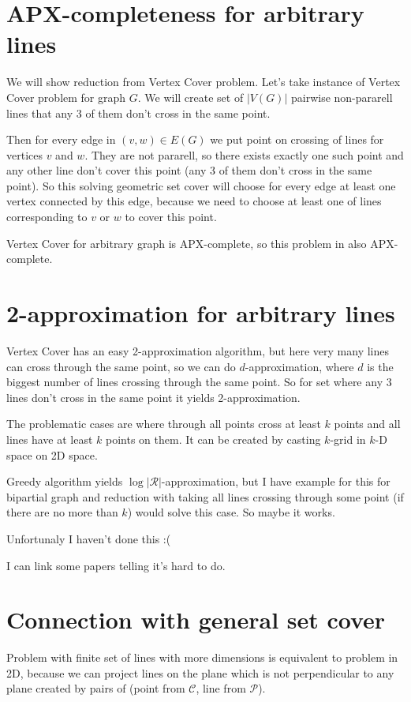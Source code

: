 \documentclass[en]{pracamgr}
\begin{document}
\section{APX-completeness for arbitrary lines}
We will show reduction from Vertex Cover problem.
Let's take instance of Vertex Cover problem for graph $G$.
We will create set of $|V(G)|$ pairwise non-pararell lines
that any 3 of them don't cross in the same point.

Then for every edge in $(v, w) \in E(G)$
we put point on crossing of lines for vertices $v$ and $w$.
They are not pararell, so there exists exactly one such point
and any other line don't cover this point (any 3 of them don't
cross in the same point).
So this solving geometric set cover will choose
for every edge at least one vertex connected by this edge,
because we need to choose at least one of
lines corresponding to $v$ or $w$ to cover this point.

Vertex Cover for arbitrary graph is APX-complete,
so this problem in also APX-complete.

\section{2-approximation for arbitrary lines}
Vertex Cover has an easy 2-approximation algorithm,
but here very many lines can cross through
the same point, so we can do $d$-approximation,
where $d$ is the biggest number of lines crossing through the same point.
So for set where any 3 lines don't cross in the same point
it yields 2-approximation.

The problematic cases are where through all points
cross at least $k$ points and all lines have at least $k$ points on them.
It can be created by casting $k$-grid in $k$-D space on 2D space.

Greedy algorithm yields $\log |\mathcal{R}|$-approximation,
but I have example for this for bipartial graph and
reduction with taking all lines crossing through some point
(if there are no more than $k$) would solve this case.
So maybe it works.

Unfortunaly I haven't done this :(

I can link some papers telling it's hard to do.

\section{Connection with general set cover}
Problem with finite set of lines with more dimensions
is equivalent
to problem in 2D, because we can project
lines on the plane which is not perpendicular
to any plane created by pairs of
(point from $\mathcal{C}$, line from $\mathcal{P}$).
\end{document}
